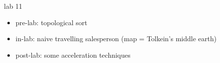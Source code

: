 \begin{frame}{lab 11}
\begin{itemize}
\item pre-lab: topological sort
\item in-lab: naive travelling salesperson (map = Tolkein's middle earth)
\item post-lab: some acceleration techniques
\end{itemize}
\end{frame}
